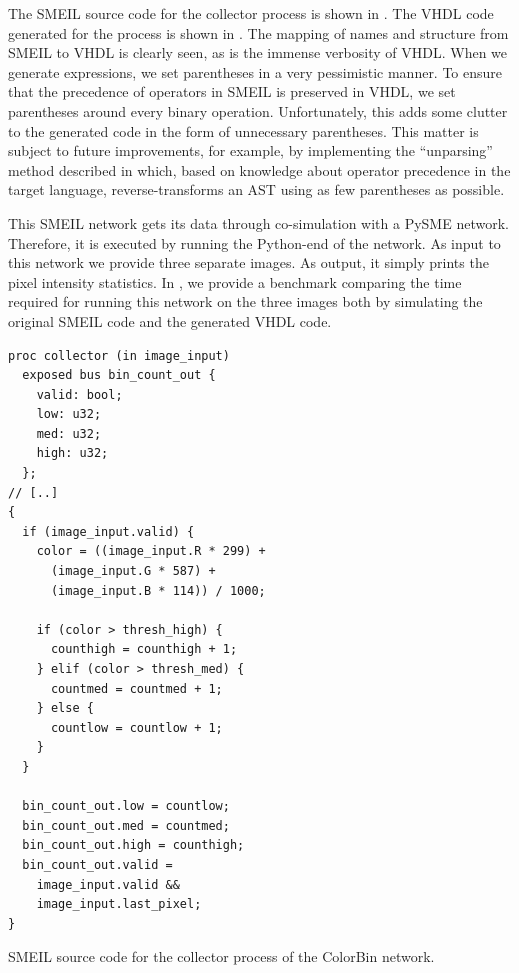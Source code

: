 The SMEIL source code for the collector process is shown in
. The VHDL code generated for the process is shown in
. The mapping of names and structure from SMEIL to VHDL is
clearly seen, as is the immense verbosity of VHDL. When we generate expressions,
we set parentheses in a very pessimistic manner. To ensure that the precedence
of operators in SMEIL is preserved in VHDL, we set parentheses around every
binary operation. Unfortunately, this adds some clutter to the generated code in
the form of unnecessary parentheses. This matter is subject to future
improvements, for example, by implementing the ``unparsing'' method described in
\cite{ramsey1998unparsing} which, based on knowledge about operator precedence
in the target language, reverse-transforms an AST using as few parentheses as
possible.

This SMEIL network gets its data through co-simulation with a PySME
network. Therefore, it is executed by running the Python-end of the network. As
input to this network we provide three separate images. As output, it simply
prints the pixel intensity statistics. In , we provide a
benchmark comparing the time required for running this network on the three
images both by simulating the original SMEIL code and the generated VHDL code.

\begin{widefigure}

\begin{lstlisting}[language=smeil,multicols=2]
proc collector (in image_input)
  exposed bus bin_count_out {
    valid: bool;
    low: u32;
    med: u32;
    high: u32;
  };
// [..]
{
  if (image_input.valid) {
    color = ((image_input.R * 299) +
      (image_input.G * 587) +
      (image_input.B * 114)) / 1000;

    if (color > thresh_high) {
      counthigh = counthigh + 1;
    } elif (color > thresh_med) {
      countmed = countmed + 1;
    } else {
      countlow = countlow + 1;
    }
  }

  bin_count_out.low = countlow;
  bin_count_out.med = countmed;
  bin_count_out.high = counthigh;
  bin_count_out.valid =
    image_input.valid &&
    image_input.last_pixel;
}
\end{lstlisting}
  \caption{SMEIL source code for the collector process of the ColorBin network.}
  \label{fig:collector}
\end{widefigure}

